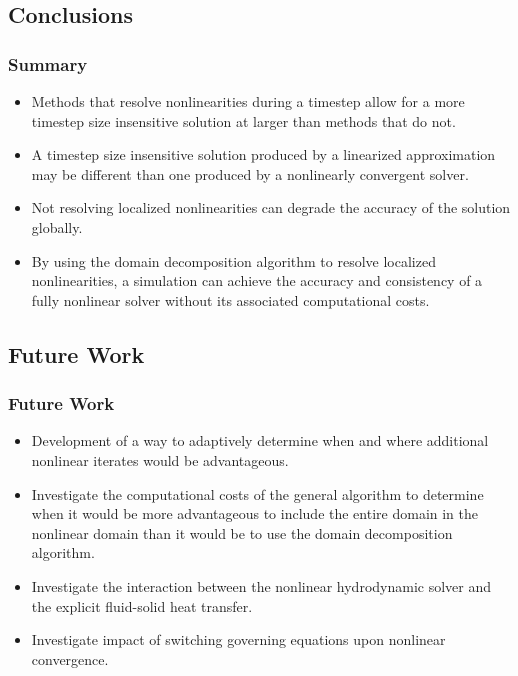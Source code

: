 \documentclass[compress,xcolor=table]{beamer}
\begin{document}
\subsection[Conclusions]{Conclusions}
\begin{frame}
\frametitle{Summary}

\begin{itemize}
\item{Methods that resolve nonlinearities during a timestep allow for a more timestep size insensitive solution at larger \dtmax{} than methods that do not.}
\item{A timestep size insensitive solution produced by a linearized approximation may be different than one produced by a nonlinearly convergent solver.}
\item{Not resolving localized nonlinearities can degrade the accuracy of the solution globally.}
\item{By using the domain decomposition algorithm to resolve localized nonlinearities, a simulation can achieve the accuracy and consistency of a fully nonlinear solver without its associated computational costs.}
\end{itemize}

\end{frame}
\subsection[Future Work]{Future Work}
\begin{frame}
\frametitle{Future Work}

\begin{itemize}
\item{Development of a way to adaptively determine when and where additional nonlinear iterates would be advantageous.}
\item{Investigate the computational costs of the general algorithm to determine when it would be more advantageous to include the entire domain in the nonlinear domain than it would be to use the domain decomposition algorithm.}
\item{Investigate the interaction between the nonlinear hydrodynamic solver and the explicit fluid-solid heat transfer.}
\item{Investigate impact of switching governing equations upon nonlinear convergence.}
\end{itemize}

\end{frame}
\end{document}
